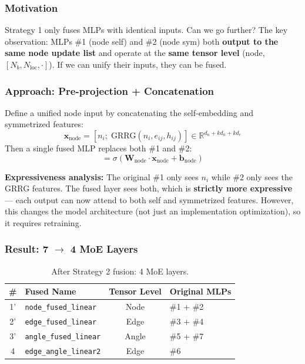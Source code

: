 \documentclass[11pt,a4paper]{article}
\newcommand{\R}{\mathbb{R}}
\newcommand{\act}{\sigma}
\newcommand{\W}{\mathbf{W}}
\newcommand{\bb}{\mathbf{b}}
\newcommand{\x}{\mathbf{x}}
\begin{document}
\subsubsection{Motivation}

Strategy 1 only fuses MLPs with identical inputs. Can we go further? The key observation: MLPs \#1 (node self) and \#2 (node sym) both \textbf{output to the same node update list} and operate at the \textbf{same tensor level} (node, $[N_b, N_{\text{loc}}, \cdot]$). If we can unify their inputs, they can be fused.

\subsubsection{Approach: Pre-projection + Concatenation}

Define a unified node input by concatenating the self-embedding and symmetrized features:
\begin{equation}
    \x_{\text{node}} = [n_i;\; \text{GRRG}(n_i, e_{ij}, h_{ij})] \in \R^{d_n + kd_n + kd_e}
\end{equation}
Then a single fused MLP replaces both \#1 and \#2:
\begin{equation}
    [\underbrace{y_{\text{self}}}_{\R^{d_n}};\; \underbrace{y_{\text{sym}}}_{\R^{d_n}}] = \act\!\left(\W_{\text{node}} \cdot \x_{\text{node}} + \bb_{\text{node}}\right)
\end{equation}

\textbf{Expressiveness analysis:} The original \#1 only sees $n_i$ while \#2 only sees the GRRG features. The fused layer sees both, which is \textbf{strictly more expressive} --- each output can now attend to both self and symmetrized features. However, this changes the model architecture (not just an implementation optimization), so it requires retraining.

\subsubsection{Result: 7 $\to$ 4 MoE Layers}

\begin{table}[h]
\centering
\begin{tabular}{clcl}
\toprule
\# & Fused Name & Tensor Level & Original MLPs \\
\midrule
1' & \texttt{node\_fused\_linear} & Node & \#1 + \#2 \\
2' & \texttt{edge\_fused\_linear} & Edge & \#3 + \#4 \\
3' & \texttt{angle\_fused\_linear} & Angle & \#5 + \#7 \\
4 & \texttt{edge\_angle\_linear2} & Edge & \#6 \\
\bottomrule
\end{tabular}
\caption{After Strategy 2 fusion: 4 MoE layers.}
\end{table}
\end{document}
